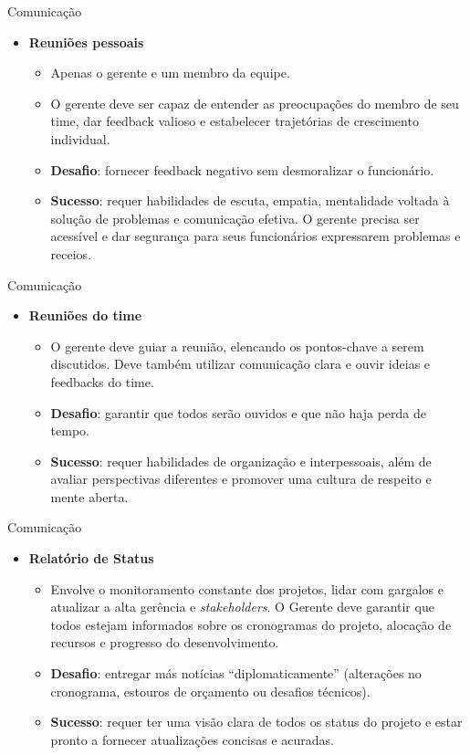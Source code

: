 \documentclass{beamer}
\begin{document}
\begin{frame}{Comunicação}
	\begin{itemize}
		\justifying
		\item \textbf{Reuniões pessoais}
			\begin{itemize}
				\justifying
				\item Apenas o gerente e um membro da equipe.
				\item O gerente deve ser capaz de entender as preocupações do membro de seu time, dar feedback valioso e estabelecer trajetórias de crescimento individual.
				\item \textbf{Desafio}: fornecer feedback negativo sem desmoralizar o funcionário.
				\item \textbf{Sucesso}: requer habilidades de escuta, empatia, mentalidade voltada à solução de problemas e comunicação efetiva. O gerente precisa ser acessível e dar segurança para seus funcionários expressarem problemas e receios.
			\end{itemize}
	\end{itemize}
\end{frame}

\begin{frame}{Comunicação}
	\begin{itemize}
		\justifying
		\item \textbf{Reuniões do time}
		\begin{itemize}
			\justifying
			\item O gerente deve guiar a reunião, elencando os pontos-chave a serem discutidos. Deve também utilizar comunicação clara e ouvir ideias e feedbacks do time.
			\item \textbf{Desafio}: garantir que todos serão ouvidos e que não haja perda de tempo.
			\item \textbf{Sucesso}: requer habilidades de organização e interpessoais, além de avaliar perspectivas diferentes e promover uma cultura de respeito e mente aberta.
		\end{itemize}
	\end{itemize}
\end{frame}

\begin{frame}{Comunicação}
	\begin{itemize}
		\justifying
		\item \textbf{Relatório de Status}
		\begin{itemize}
			\justifying
			\item Envolve o monitoramento constante dos projetos, lidar com gargalos e atualizar a alta gerência e \textit{stakeholders}. O Gerente deve garantir que todos estejam informados sobre os cronogramas do projeto, alocação de recursos e progresso do desenvolvimento.
			\item \textbf{Desafio}: entregar más notícias ``diplomaticamente'' (alterações no cronograma, estouros de orçamento ou desafios técnicos).
			\item \textbf{Sucesso}: requer ter uma visão clara de todos os status do projeto e estar pronto a fornecer atualizações concisas e acuradas.
		\end{itemize}
	\end{itemize}
\end{frame}
\end{document}
